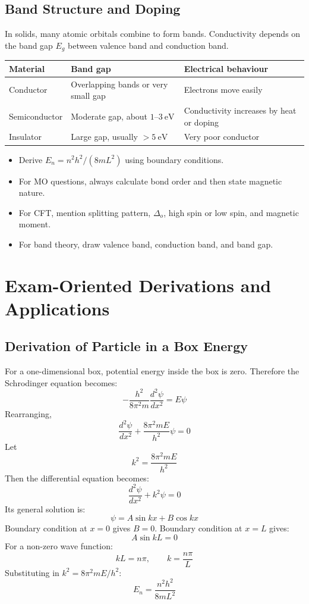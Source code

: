 \documentclass[12pt,a4paper]{article}
\begin{document}
\subsection{Band Structure and Doping}
In solids, many atomic orbitals combine to form bands. Conductivity depends on the band gap $E_g$ between valence band and conduction band.

\begin{tabularx}{\linewidth}{|B{3cm}|Y|Y|}
\hline
\textbf{Material} & \textbf{Band gap} & \textbf{Electrical behaviour} \\
\hline
Conductor & Overlapping bands or very small gap & Electrons move easily \\
\hline
Semiconductor & Moderate gap, about $1$--$3\ \mathrm{eV}$ & Conductivity increases by heat or doping \\
\hline
Insulator & Large gap, usually $>5\ \mathrm{eV}$ & Very poor conductor \\
\hline
\end{tabularx}

\begin{tcolorbox}[exambox, title={Exam Points}]
\begin{itemize}[leftmargin=*, itemsep=2pt, topsep=2pt]
  \item Derive $E_n=n^2h^2/(8mL^2)$ using boundary conditions.
  \item For MO questions, always calculate bond order and then state magnetic nature.
  \item For CFT, mention splitting pattern, $\Delta_o$, high spin or low spin, and magnetic moment.
  \item For band theory, draw valence band, conduction band, and band gap.
\end{itemize}
\end{tcolorbox}

\section{Exam-Oriented Derivations and Applications}

\subsection{Derivation of Particle in a Box Energy}
For a one-dimensional box, potential energy inside the box is zero. Therefore the Schrodinger equation becomes:
\[
-\frac{h^2}{8\pi^2m}\frac{d^2\psi}{dx^2}=E\psi
\]
Rearranging,
\[
\frac{d^2\psi}{dx^2}+\frac{8\pi^2mE}{h^2}\psi=0
\]
Let
\[
k^2=\frac{8\pi^2mE}{h^2}
\]
Then the differential equation becomes:
\[
\frac{d^2\psi}{dx^2}+k^2\psi=0
\]
Its general solution is:
\[
\psi=A\sin kx+B\cos kx
\]
Boundary condition at $x=0$ gives $B=0$. Boundary condition at $x=L$ gives:
\[
A\sin kL=0
\]
For a non-zero wave function:
\[
kL=n\pi,\qquad k=\frac{n\pi}{L}
\]
Substituting in $k^2=8\pi^2mE/h^2$:
\[
E_n=\frac{n^2h^2}{8mL^2}
\]
\end{document}
